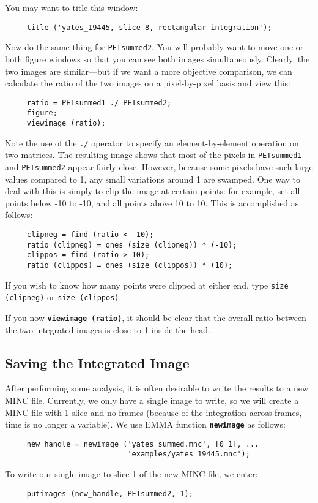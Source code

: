 \documentclass[11pt]{article}
\def\code#1{{\tt \bf #1}}
\begin{document}
You may want to title this window:
\begin{verbatim}
     title ('yates_19445, slice 8, rectangular integration');
\end{verbatim}

Now do the same thing for \verb|PETsummed2|.  You will probably want
to move one or both figure windows so that you can see both images
simultaneously.  Clearly, the two images are similar---but if we want
a more objective comparison, we can calculate the ratio of the two
images on a pixel-by-pixel basis and view this:
\begin{verbatim}
     ratio = PETsummed1 ./ PETsummed2;
     figure;
     viewimage (ratio);
\end{verbatim}

Note the use of the \verb|./| operator to specify an
element-by-element operation on two matrices.  The resulting image
shows that most of the pixels in \verb|PETsummed1| and
\verb|PETsummed2| appear fairly close.  However, because some pixels
have such large values compared to 1, any small variations around 1
are swamped.  One way to deal with this is simply to clip the image
at certain points: for example, set all points below -10 to -10, and
all points above 10 to 10.  This is accomplished as follows:
\begin{verbatim}
     clipneg = find (ratio < -10);
     ratio (clipneg) = ones (size (clipneg)) * (-10);
     clippos = find (ratio > 10);
     ratio (clippos) = ones (size (clippos)) * (10);
\end{verbatim}

If you wish to know how many points were clipped at either end,
type \verb|size (clipneg)| or \verb|size (clippos)|.

If you now \code{viewimage (ratio)}, it should be clear that the
overall ratio between the two integrated images is close to 1 inside
the head.

\subsection{Saving the Integrated Image}

After performing some analysis, it is often desirable to write the
results to a new MINC file.  Currently, we only have a single image to
write, so we will create a MINC file with 1 slice and no frames
(because of the integration across frames, time is no longer a
variable).  We use EMMA function \code{newimage} as follows:
\begin{verbatim}
     new_handle = newimage ('yates_summed.mnc', [0 1], ...
                            'examples/yates_19445.mnc');
\end{verbatim}
To write our single image to slice 1 of the new MINC file, we enter:
\begin{verbatim}
     putimages (new_handle, PETsummed2, 1);
\end{verbatim}
\end{document}
